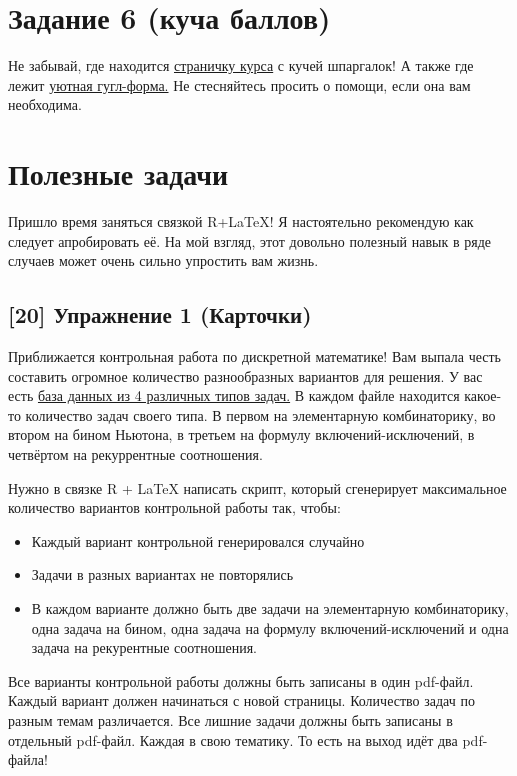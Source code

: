 \documentclass[12pt, a4paper, oneside]{article}
\begin{document}
\section*{Задание 6 (куча баллов)  }

Не забывай, где находится  \href{https://fulyankin.github.io/LaTeX/}{страничку курса} с кучей шпаргалок! А также где лежит \href{https://docs.google.com/forms/d/e/1FAIpQLSe11kxKVfv07iCL1E9yNX7ll9swKImiVwRr1H70lslGzInRSg/viewform}{уютная гугл-форма.} Не стесняйтесь просить о помощи, если она вам необходима.

\section*{Полезные задачи}

Пришло время заняться связкой R+LaTeX! Я настоятельно рекомендую как следует апробировать её. На мой взгляд, этот довольно полезный навык в ряде случаев может очень сильно упростить вам жизнь.

\subsection*{[20] Упражнение 1 (Карточки)}

Приближается контрольная работа по дискретной математике! Вам выпала честь составить огромное количество разнообразных вариантов для решения. У вас есть  \href{https://github.com/FUlyankin/LaTeX/tree/master/Logi_2018/Homework_2018/hw_7_baza_zadach.zip}{база данных из 4 различных типов задач.}   В каждом файле находится какое-то количество задач своего типа. В первом на элементарную комбинаторику, во втором на бином Ньютона, в третьем на формулу включений-исключений, в четвёртом на рекуррентные соотношения.

Нужно в связке R + \LaTeX{} написать скрипт, который сгенерирует максимальное количество вариантов контрольной работы так, чтобы:

\begin{itemize}
\item Каждый вариант контрольной генерировался случайно
\item Задачи в разных вариантах не повторялись
\item В каждом варианте должно быть две задачи на элементарную комбинаторику, одна задача на бином, одна задача на формулу включений-исключений и одна задача на рекурентные соотношения.
\end{itemize}

Все варианты контрольной работы должны быть записаны в один pdf-файл. Каждый вариант должен начинаться с новой страницы. Количество задач по разным темам различается. Все лишние задачи должны быть записаны в отдельный pdf-файл. Каждая в свою тематику. То есть на выход идёт два pdf-файла!
\end{document}

